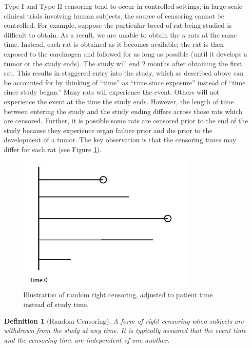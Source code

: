 \documentclass[
]{book}
\theoremstyle{plain}
\theoremstyle{mydefn}
\newtheorem{definition}{Definition}[chapter]
\theoremstyle{myexmpl}
\theoremstyle{remark}
\begin{document}
Type I and Type II censoring tend to occur in controlled settings; in large-scale clinical trials involving human subjects, the source of censoring cannot be controlled. For example, suppose the particular breed of rat being studied is difficult to obtain. As a result, we are unable to obtain the \(n\) rats at the same time. Instead, each rat is obtained as it becomes available; the rat is then exposed to the carcinogen and followed for as long as possible (until it develops a tumor or the study ends). The study will end 2 months after obtaining the first rat. This results in staggered entry into the study, which as described above can be accounted for by thinking of ``time'' as ``time since exposure'' instead of ``time since study began.'' Many rats will experience the event. Others will not experience the event at the time the study ends. However, the length of time between entering the study and the study ending differs across those rats which are censored. Further, it is possible some rats are censored prior to the end of the study because they experience organ failure prior and die prior to the development of a tumor. The key observation is that the censoring times may differ for each rat (see Figure \ref{fig:surv-censoring-random}).

\begin{figure}

{\centering \includegraphics[width=0.8\textwidth]{images/censoring-random} 

}

\caption{Illustration of random right censoring, adjusted to patient time instead of study time.}\label{fig:surv-censoring-random}
\end{figure}

\begin{definition}[Random Censoring]
A form of right censoring when subjects are withdrawn from the study at any time. It is typically assumed that the event time and the censoring time are independent of one another.
\end{definition}
\end{document}
